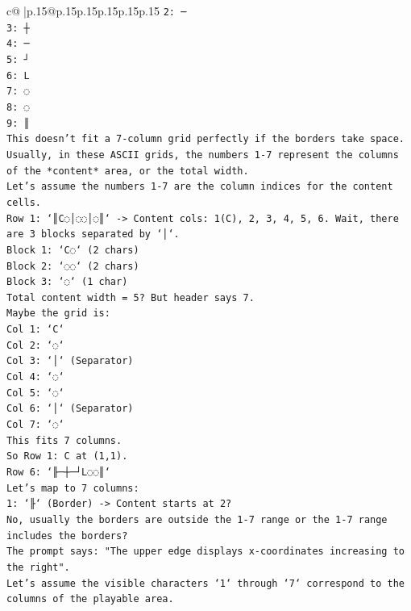 \documentclass{article}
\begin{document}
{\begin{supertabular}{c@{$\;$}|p{.15\linewidth}@{}p{.15\linewidth}p{.15\linewidth}p{.15\linewidth}p{.15\linewidth}p{.15\linewidth}}
{{{\texttt{2: ─} \\
\texttt{3: ┼} \\
\texttt{4: ─} \\
\texttt{5: ┘} \\
\texttt{6: L} \\
\texttt{7: ◌} \\
\texttt{8: ◌} \\
\texttt{9: ║} \\
\texttt{This doesn't fit a 7{-}column grid perfectly if the borders take space. Usually, in these ASCII grids, the numbers 1{-}7 represent the columns of the *content* area, or the total width.} \\
\texttt{Let's assume the numbers 1{-}7 are the column indices for the content cells.} \\
\texttt{Row 1: `║C◌│◌◌│◌║` {-}> Content cols: 1(C), 2, 3, 4, 5, 6. Wait, there are 3 blocks separated by `│`.} \\
\texttt{Block 1: `C◌` (2 chars)} \\
\texttt{Block 2: `◌◌` (2 chars)} \\
\texttt{Block 3: `◌` (1 char)} \\
\texttt{Total content width = 5? But header says 7.} \\
\texttt{Maybe the grid is:} \\
\texttt{Col 1: `C`} \\
\texttt{Col 2: `◌`} \\
\texttt{Col 3: `│` (Separator)} \\
\texttt{Col 4: `◌`} \\
\texttt{Col 5: `◌`} \\
\texttt{Col 6: `│` (Separator)} \\
\texttt{Col 7: `◌`} \\
\texttt{This fits 7 columns.} \\
\texttt{So Row 1: C at (1,1).} \\
\texttt{Row 6: `╟─┼─┘L◌◌║`} \\
\texttt{Let's map to 7 columns:} \\
\texttt{1: `╟` (Border) {-}> Content starts at 2?} \\
\texttt{No, usually the borders are outside the 1{-}7 range or the 1{-}7 range includes the borders?} \\
\texttt{The prompt says: "The upper edge displays x{-}coordinates increasing to the right".} \\
\texttt{Let's assume the visible characters `1` through `7` correspond to the columns of the playable area.} \\
}}}
\end{supertabular}}
\end{document}

